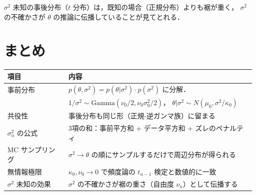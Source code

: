 \documentclass[lualatex,ja=standard,a4paper,12pt]{bxjsarticle}
\begin{document}
\noindent $\sigma^2$ 未知の事後分布（$t$ 分布）は，既知の場合（正規分布）よりも裾が重く，
$\sigma^2$ の不確かさが $\theta$ の推論に伝播していることが見てとれる．


\section{まとめ}

\begin{center}
\renewcommand{\arraystretch}{1.4}
\begin{tabular}{lp{9.5cm}}
\toprule
\textbf{項目} & \textbf{内容} \\
\midrule
事前分布 &
  $p(\theta, \sigma^2) = p(\theta|\sigma^2) \cdot p(\sigma^2)$ に分解．\\
  & $1/\sigma^2 \sim \text{Gamma}(\nu_0/2, \nu_0\sigma_0^2/2)$，
    $\theta|\sigma^2 \sim N(\mu_0, \sigma^2/\kappa_0)$ \\
共役性 &
  事後分布も同じ形（正規-逆ガンマ族）に留まる \\
$\sigma_n^2$ の公式 &
  3項の和：事前平方和 $+$ データ平方和 $+$ ズレのペナルティ \\
MC サンプリング &
  $\sigma^2 \to \theta$ の順にサンプルするだけで周辺分布が得られる \\
無情報極限 &
  $\kappa_0, \nu_0 \to 0$ で頻度論の $t_{n-1}$ 検定と数値的に一致 \\
$\sigma^2$ 未知の効果 &
  $\sigma^2$ の不確かさが裾の重さ（自由度 $\nu_n$）として伝播する \\
\bottomrule
\end{tabular}
\end{center}
\end{document}
